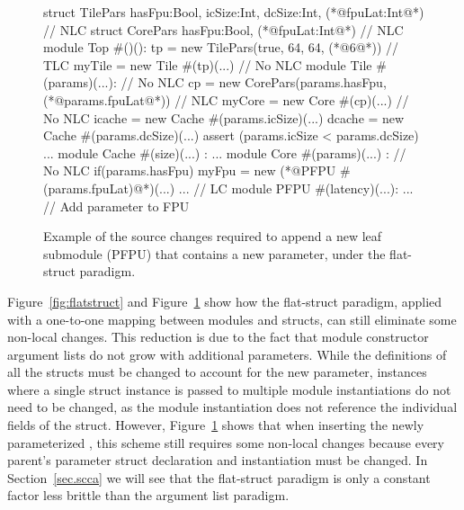 \begin{figure}
\centering
\begin{phdl}
struct TilePars {hasFpu:Bool, icSize:Int, dcSize:Int, (*@\textcolor[rgb]{1,0,0}{fpuLat:Int}@*)} // NLC
struct CorePars {hasFpu:Bool, (*@\textcolor[rgb]{1,0,0}{fpuLat:Int}@*)}                         // NLC
module Top #()():
  tp = new TilePars(true, 64, 64, (*@\textcolor[rgb]{1,0,0}{6}@*))                              // TLC
  myTile = new Tile #(tp)(...)                                    // No NLC
module Tile #(params)(...):                                       // No NLC
  cp = new CorePars(params.hasFpu, (*@\textcolor[rgb]{1,0,0}{params.fpuLat}@*))                 // NLC
  myCore = new Core  #(cp)(...)                                   // No NLC
  icache = new Cache #(params.icSize)(...)
  dcache = new Cache #(params.dcSize)(...)
  assert (params.icSize < params.dcSize) ...
module Cache #(size)(...) : ...
module Core #(params)(...) :                                     // No NLC
  if(params.hasFpu) myFpu = new (*@\textcolor[rgb]{1,0,0}{PFPU \#(params.fpuLat)}@*)(...) ...   // LC
module PFPU #(latency)(...): ...     // Add parameter to FPU 
\end{phdl} 
\caption{Example of the source changes required to append a new leaf submodule (PFPU) that contains a new parameter,
under the flat-struct paradigm.}
\label{fig:flatstruct-delta}
\end{figure}

Figure~\ref{fig:flatstruct} and Figure~\ref{fig:flatstruct-delta} show how the flat-struct paradigm,
applied with a one-to-one mapping between modules and structs,
can still eliminate some non-local changes.
This reduction is due to the fact that module constructor argument lists do not grow with additional parameters.
While the definitions of all the structs must be changed to account for the new parameter,
instances where a single struct instance is passed to multiple module instantiations do not need to be changed,
as the module instantiation does not reference the individual fields of the struct.
However, Figure~\ref{fig:flatstruct-delta} shows that when inserting the newly parameterized ,
this scheme still requires some non-local changes because every parent's parameter struct declaration and instantiation must be changed.
In Section~\ref{sec.scca} we will see that the flat-struct paradigm is only a constant factor less brittle than the argument list paradigm.


